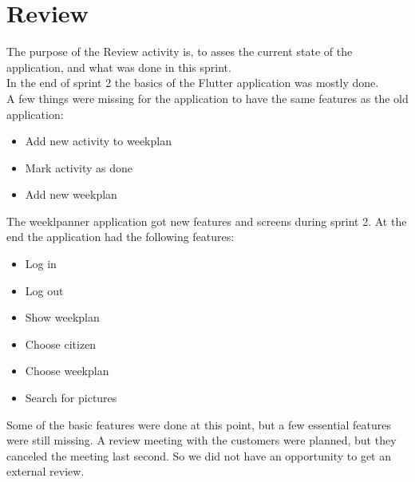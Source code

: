 \section{Review}

The purpose of the Review activity is, to asses the current state of the application, and what was done in this sprint.\\
In the end of sprint 2 the basics of the Flutter application was mostly done.\\
A few things were missing for the application to have the same features as the old application:
\begin{itemize}
    \item Add new activity to weekplan
    \item Mark activity as done
    \item Add new weekplan
\end{itemize}

The weeklpanner application got new features and screens during sprint 2. At the end the application had the following features:
\begin{itemize}
    \item Log in
    \item Log out
    \item Show weekplan 
    \item Choose citizen
    \item Choose weekplan
    \item Search for pictures
\end{itemize}

Some of the basic features were done at this point, but a few essential features were still missing. 
A review meeting with the customers were planned, but they canceled the meeting last second. So we did not have an opportunity  to get an external review.